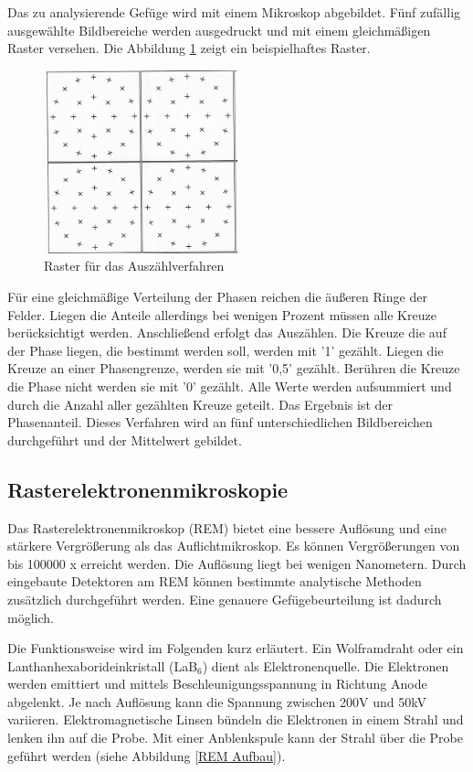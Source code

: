 \documentclass[a4paper, 11pt]{tubsreprt}
\begin{document}
Das zu analysierende Gefüge wird mit einem Mikroskop abgebildet. Fünf zufällig ausgewählte Bildbereiche werden ausgedruckt und mit einem gleichmäßigen Raster versehen. Die Abbildung \ref{Raster für das Auszählverfahren} zeigt ein beispielhaftes Raster.
\begin{figure} %
\centering
\includegraphics[width=0.5\textwidth]{Bilder/Raster.png}
\caption{Raster für das Auszählverfahren}
\label{Raster für das Auszählverfahren}
\end{figure}

Für eine gleichmäßige Verteilung der Phasen reichen die äußeren Ringe der Felder. Liegen die Anteile allerdings bei wenigen Prozent müssen alle Kreuze berücksichtigt werden. 
Anschließend erfolgt das Auszählen. Die Kreuze die auf der Phase liegen, die bestimmt werden soll, werden mit '1' gezählt. Liegen die Kreuze an einer Phasengrenze, werden sie mit '0,5' gezählt. Berühren die Kreuze die Phase nicht werden sie mit '0' gezählt. Alle Werte werden aufsummiert und durch die Anzahl aller gezählten Kreuze geteilt. Das Ergebnis ist der Phasenanteil. Dieses Verfahren wird an fünf unterschiedlichen Bildbereichen durchgeführt und der Mittelwert gebildet.

\subsection{Rasterelektronenmikroskopie}\label{Kapitel Rasterelektrodenmikroskopie}
Das Rasterelektronenmikroskop (REM) bietet eine bessere Auflösung und eine stärkere Vergrößerung als das Auflichtmikroskop. Es können Vergrößerungen von bis 100000 x erreicht werden. Die Auflösung liegt bei wenigen Nanometern. Durch eingebaute Detektoren am REM können bestimmte analytische Methoden zusätzlich durchgeführt werden. Eine genauere Gefügebeurteilung ist dadurch möglich.  

Die Funktionsweise wird im Folgenden kurz erläutert. Ein Wolframdraht oder ein Lanthanhexaborideinkristall (LaB$_{6}$) dient als Elektronenquelle. Die Elektronen werden emittiert und mittels Beschleunigungsspannung in Richtung Anode abgelenkt. Je nach Auflösung kann die Spannung zwischen 200V und 50kV variieren. Elektromagnetische Linsen bündeln die Elektronen in einem Strahl und lenken ihn auf die Probe. Mit einer Anblenkspule kann der Strahl über die Probe geführt werden (siehe Abbildung \ref{REM Aufbau}).  
\end{document}
